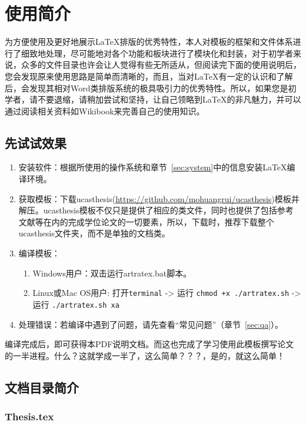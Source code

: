 
\chapter{使用简介}
\label{chap:guide}

为方便使用及更好地展示\LaTeX{}排版的优秀特性，本人对模板的框架和文件体系进行了细致地处理，尽可能地对各个功能和板块进行了模块化和封装，对于初学者来说，众多的文件目录也许会让人觉得有些无所适从，但阅读完下面的使用说明后，您会发现原来使用思路是简单而清晰的，而且，当对\LaTeX{}有一定的认识和了解后，会发现其相对Word类排版系统的极具吸引力的优秀特性。所以，如果您是初学者，请不要退缩，请稍加尝试和坚持，让自己领略到\LaTeX{}的非凡魅力，并可以通过阅读相关资料如Wikibook\citep{wikibook2014latex}来完善自己的使用知识。

\section{先试试效果}

\begin{enumerate}
    \item 安装软件：根据所使用的操作系统和章节~\ref{sec:system}中的信息安装\LaTeX{}编译环境。
    \item 获取模板：下载ucasthesis(\url{https://github.com/mohuangrui/ucasthesis})模板并解压。ucasthesis模板不仅只是提供了相应的类文件，同时也提供了包括参考文献等在内的完成学位论文的一切要素，所以，下载时，推荐下载整个ucasthesis文件夹，而不是单独的文档类。
    \item 编译模板：
        \begin{enumerate}
            \item Windows用户：双击运行artratex.bat脚本。
            \item Linux或Mac OS用户: 打开\verb|terminal| -> 运行 \verb|chmod +x ./artratex.sh| -> 运行 \verb|./artratex.sh xa|
        \end{enumerate}
    \item 处理错误：若编译中遇到了问题，请先查看“常见问题”（章节~\ref{sec:qa}）。
\end{enumerate}

编译完成后，即可获得本PDF说明文档。而这也完成了学习使用此模板撰写论文的一半进程。什么？这就学成一半了，这么简单？？？，是的，就这么简单！

\section{文档目录简介}

\subsection{Thesis.tex}

